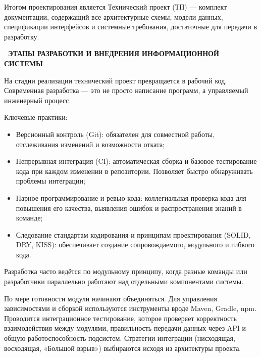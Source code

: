 \documentclass{SibFU-docs}
\begin{document}
Итогом проектирования является Технический проект (ТП) — комплект документации, содержащий все архитектурные схемы, модели данных, спецификации интерфейсов и системные требования, достаточные для передачи в разработку. \cite{sommerville2016se, pressman2014se, gost3460190}

\newpage
{}
\begin{center}\textbf{\thesection\ ЭТАПЫ РАЗРАБОТКИ И ВНЕДРЕНИЯ ИНФОРМАЦИОННОЙ СИСТЕМЫ}\end{center}
\vspace*{-1.5em}

На стадии реализации технический проект превращается в рабочий код. Современная разработка — это не просто написание программ, а управляемый инженерный процесс.


Ключевые практики:

\begin{itemize}[label=-]
    \item Версионный контроль (Git): обязателен для совместной работы, отслеживания изменений и возможности отката;
    \item Непрерывная интеграция (CI): автоматическая сборка и базовое тестирование кода при каждом изменении в репозитории. Позволяет быстро обнаруживать проблемы интеграции;
    \item Парное программирование и ревью кода: коллегиальная проверка кода для повышения его качества, выявления ошибок и распространения знаний в команде;
    \item Следование стандартам кодирования и принципам проектирования (SOLID, DRY, KISS): обеспечивает создание сопровождаемого, модульного и гибкого кода.
\end{itemize}

Разработка часто ведётся по модульному принципу, когда разные команды или разработчики параллельно работают над отдельными компонентами системы. \cite{sommerville2016se, pressman2014se}


По мере готовности модули начинают объединяться. Для управления зависимостями и сборкой используются инструменты вроде Maven, Gradle, npm. Проводится интеграционное тестирование, которое проверяет корректность взаимодействия между модулями, правильность передачи данных через API и общую работоспособность подсистем. Стратегии интеграции (нисходящая, восходящая, «Большой взрыв») выбираются исходя из архитектуры проекта.
\end{document}
